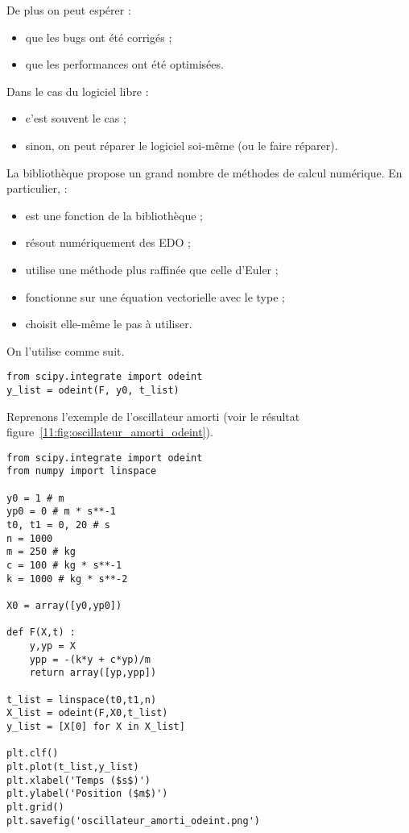 
De plus on peut espérer :
\begin{itemize}
\item que les bugs ont été corrigés ;
\item que les performances ont été optimisées.
\end{itemize}

Dans le cas du logiciel libre :
\begin{itemize}
\item c'est souvent le cas ; 
\item sinon, on peut réparer le logiciel soi-même (ou le faire réparer).
\end{itemize}

La bibliothèque  propose un grand nombre de méthodes de calcul numérique. En particulier,  :
\begin{itemize}
\item est une fonction de la bibliothèque  ;
\item résout numériquement des EDO ;
\item utilise une méthode plus raffinée que celle d'Euler ;
\item fonctionne sur une équation vectorielle avec le type  ;
\item choisit elle-même le pas à utiliser.
\end{itemize}

On l'utilise comme suit.
\begin{lstlisting}
from scipy.integrate import odeint
y_list = odeint(F, y0, t_list)
\end{lstlisting}

Reprenons l'exemple de l'oscillateur amorti (voir le résultat figure~\ref{11:fig:oscillateur_amorti_odeint}).
\begin{lstlisting}
from scipy.integrate import odeint
from numpy import linspace

y0 = 1 # m
yp0 = 0 # m * s**-1
t0, t1 = 0, 20 # s
n = 1000
m = 250 # kg
c = 100 # kg * s**-1
k = 1000 # kg * s**-2

X0 = array([y0,yp0])

def F(X,t) :
    y,yp = X
    ypp = -(k*y + c*yp)/m
    return array([yp,ypp])

t_list = linspace(t0,t1,n)
X_list = odeint(F,X0,t_list)
y_list = [X[0] for X in X_list]

plt.clf()
plt.plot(t_list,y_list)
plt.xlabel('Temps ($s$)')
plt.ylabel('Position ($m$)')
plt.grid()
plt.savefig('oscillateur_amorti_odeint.png')
\end{lstlisting}


